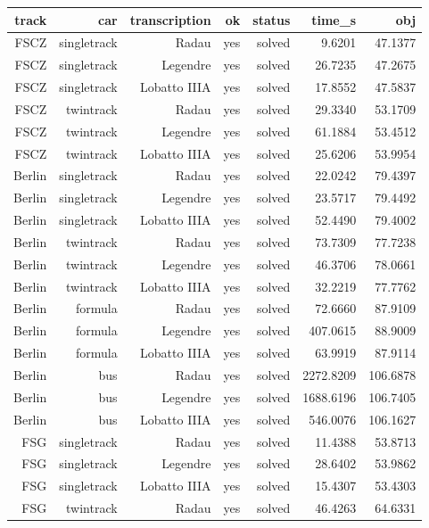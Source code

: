 {\footnotesize
\begin{longtable}{|r|r|r|r|r|r|r|}
  \hline
  \textbf{track} & \textbf{car} & \textbf{transcription} & \textbf{ok} & \textbf{status} & \textbf{time\_s} & \textbf{obj} \\
  \hline
  FSCZ & singletrack & Radau & yes & solved & 9.6201 & 47.1377 \\
  FSCZ & singletrack & Legendre & yes & solved & 26.7235 & 47.2675 \\
  FSCZ & singletrack & Lobatto IIIA & yes & solved & 17.8552 & 47.5837 \\
  FSCZ & twintrack & Radau & yes & solved & 29.3340 & 53.1709 \\
  FSCZ & twintrack & Legendre & yes & solved & 61.1884 & 53.4512 \\
  FSCZ & twintrack & Lobatto IIIA & yes & solved & 25.6206 & 53.9954 \\
  Berlin & singletrack & Radau & yes & solved & 22.0242 & 79.4397 \\
  Berlin & singletrack & Legendre & yes & solved & 23.5717 & 79.4492 \\
  Berlin & singletrack & Lobatto IIIA & yes & solved & 52.4490 & 79.4002 \\
  Berlin & twintrack & Radau & yes & solved & 73.7309 & 77.7238 \\
  Berlin & twintrack & Legendre & yes & solved & 46.3706 & 78.0661 \\
  Berlin & twintrack & Lobatto IIIA & yes & solved & 32.2219 & 77.7762 \\
  Berlin & formula & Radau & yes & solved & 72.6660 & 87.9109 \\
  Berlin & formula & Legendre & yes & solved & 407.0615 & 88.9009 \\
  Berlin & formula & Lobatto IIIA & yes & solved & 63.9919 & 87.9114 \\
  Berlin & bus & Radau & yes & solved & 2272.8209 & 106.6878 \\
  Berlin & bus & Legendre & yes & solved & 1688.6196 & 106.7405 \\
  Berlin & bus & Lobatto IIIA & yes & solved & 546.0076 & 106.1627 \\
  FSG & singletrack & Radau & yes & solved & 11.4388 & 53.8713 \\
  FSG & singletrack & Legendre & yes & solved & 28.6402 & 53.9862 \\
  FSG & singletrack & Lobatto IIIA & yes & solved & 15.4307 & 53.4303 \\
  FSG & twintrack & Radau & yes & solved & 46.4263 & 64.6331 \\

\end{longtable}}

